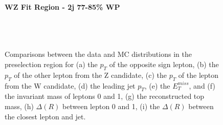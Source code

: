 \begin{figure}[H] 
    \centering
    \textbf{WZ Fit Region - 2j 77-85\% WP}\\
    \\
    \\
    \\
    \caption{Comparisons between the data and MC distributions in the preselection region for (a) the $p_T$ of the opposite sign lepton, (b) the $p_T$ of the other lepton from the Z candidate, (c) the $p_T$ of the lepton from the W candidate, (d) the leading jet $p_T$, (e) the $E_T^{miss}$, and (f) the invariant mass of leptons 0 and 1, (g) the reconstructed top mass, (h) $\Delta(R)$  between lepton 0 and 1, (i) the $\Delta(R)$ between the closest lepton and jet.}
    \label{kin:WP_2j_77_85}
\end{figure}

